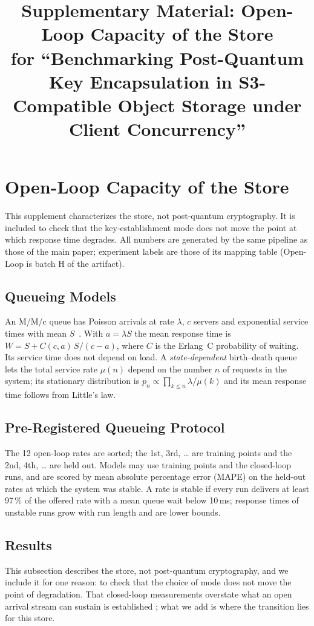 \documentclass[conference]{IEEEtran}
\newcommand{\lab}[1]{\textsf{#1}}
\begin{document}
\title{Supplementary Material: Open-Loop Capacity of the Store\\[2pt]
\large for ``Benchmarking Post-Quantum Key Encapsulation in S3-Compatible Object Storage under Client Concurrency''}
\author{}
\maketitle

\section{Open-Loop Capacity of the Store}\label{sec:queue}
This supplement characterizes the store, not post-quantum cryptography. It is included to check that the key-establishment mode does not move the point at which response time degrades. All numbers are generated by the same pipeline as those of the main paper; experiment labels are those of its mapping table (\lab{Open-Loop} is batch H of the artifact).

\subsection{Queueing Models}
An M/M/c queue has Poisson arrivals at rate $\lambda$, $c$ servers and exponential service times
with mean $S$~\cite{harchol2013}. With $a=\lambda S$ the mean response time is
$W=S+C(c,a)\,S/(c-a)$, where $C$ is the Erlang~C probability of waiting. Its service time does
not depend on load. A \emph{state-dependent} birth--death queue lets the total service rate
$\mu(n)$ depend on the number $n$ of requests in the system; its stationary distribution is
$p_n\propto\prod_{k\le n}\lambda/\mu(k)$ and its mean response time follows from Little's law.


\subsection{Pre-Registered Queueing Protocol}\label{sec:qprotocol}
The 12 open-loop rates are sorted; the 1st, 3rd, \ldots{} are training points and the 2nd, 4th,
\ldots{} are held out. Models may use training points and the closed-loop runs, and are scored by
mean absolute percentage error (MAPE) on the held-out rates at which the system was stable. A
rate is stable if every run delivers at least 97\,\% of the offered rate with a mean queue wait
below 10\,ms; response times of unstable runs grow with run length and are lower bounds.


\subsection{Results}
This subsection describes the store, not post-quantum cryptography, and we include it for one
reason: to check that the choice of mode does not move the point of degradation. That closed-loop
measurements overstate what an open arrival stream can sustain is established
\cite{schroeder2006}; what we add is where the transition lies for this store.
\end{document}
